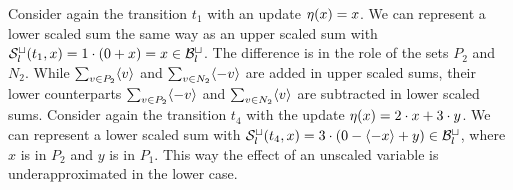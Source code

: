 \begin{example}
  Consider again the transition $t_1$ with an update $\eta(x) = x$.
  We can represent a lower scaled sum the same way as an upper scaled sum with ${\mathcal{S}^\sqcup_l}(t_1,x) = 1 \cdot (0 + x) = x \in \mathcal{B}^\sqcup_l$.
  The difference is in the role of the sets $P_2$ and $N_2$.
  While $\sum_{v \in P_2} \langle v\rangle$ and $\sum_{v \in N_2} \langle-v\rangle$ are added in upper scaled sums, their lower counterparts $\sum_{v \in P_2} \langle-v\rangle$ and $\sum_{v \in N_2} \langle v\rangle$ are subtracted in lower scaled sums.
  Consider again the transition $t_4$ with the update $\eta(x) = 2 \cdot x + 3 \cdot y$.
  We can represent a lower scaled sum with ${\mathcal{S}^\sqcup_l}(t_4,x) = 3 \cdot (0 - \langle-x\rangle + y) \in \mathcal{B}^\sqcup_l$, where $x$ is in $P_2$ and $y$ is in $P_1$.  
  This way the effect of an unscaled variable is underapproximated in the lower case.
\end{example}
